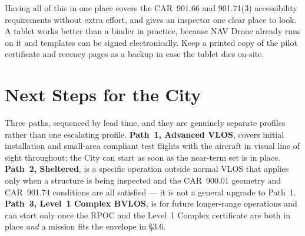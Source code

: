 \documentclass[11pt,letterpaper]{article}
\begin{document}
Having all of this in one place covers the CAR~901.66 and 901.71(3)
accessibility requirements without extra effort, and gives an inspector
one clear place to look. A tablet works better than a binder in
practice, because NAV Drone already runs on it and templates can be
signed electronically. Keep a printed copy of the pilot certificate and
recency pages as a backup in case the tablet dies on-site.

\vspace{0.6em}

\section{Next Steps for the City}

Three paths, sequenced by lead time, and they are genuinely separate
profiles rather than one escalating profile. \textbf{Path~1, Advanced
VLOS}, covers initial installation and small-area compliant test
flights with the aircraft in visual line of sight throughout; the City
can start as soon as the near-term set is in place. \textbf{Path~2,
Sheltered}, is a specific operation outside normal VLOS that applies
only when a structure is being inspected and the CAR~900.01 geometry
and CAR~901.74 conditions are all satisfied --- it is not a general
upgrade to Path~1. \textbf{Path~3, Level~1 Complex BVLOS}, is for
future longer-range operations and can start only once the RPOC and
the Level~1 Complex certificate are both in place \emph{and} a mission
fits the envelope in \S3.6.
\end{document}
